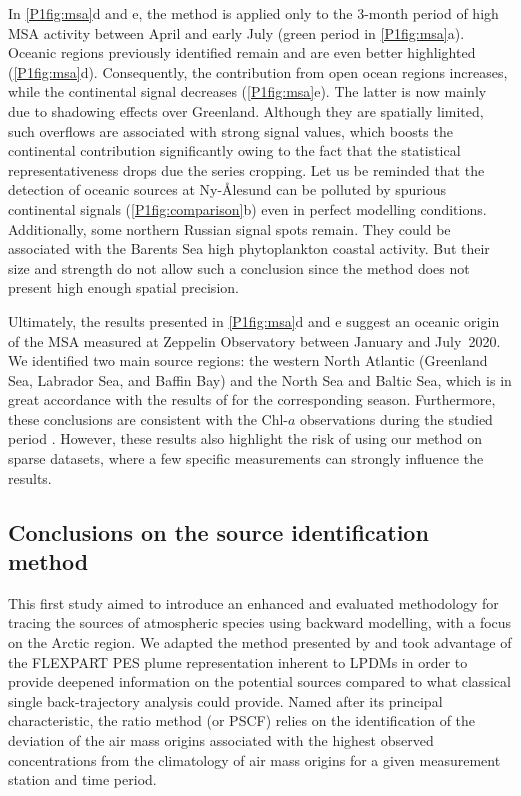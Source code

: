     In \cref{P1fig:msa}d and e, the method is applied only to the 3-month period of high MSA activity between April and early July (green period in \cref{P1fig:msa}a).
    Oceanic regions previously identified remain and are even better highlighted (\cref{P1fig:msa}d).
    Consequently, the contribution from open ocean regions increases, while the continental signal decreases (\cref{P1fig:msa}e).
    The latter is now mainly due to shadowing effects over Greenland.
    Although they are spatially limited, such overflows are associated with strong signal values, which boosts the continental contribution significantly owing to the fact that the statistical representativeness drops due the series cropping.
    Let us be reminded that the detection of oceanic sources at Ny-Ålesund can be polluted by  spurious continental signals (\cref{P1fig:comparison}b) even in perfect modelling conditions.
    Additionally, some northern Russian signal spots remain. They could be associated with the Barents Sea high phytoplankton coastal activity. But their size and strength do not allow such a conclusion since the method does not present high enough spatial precision.

    Ultimately, the results presented in \cref{P1fig:msa}d and e suggest an oceanic origin of the MSA measured at Zeppelin Observatory between January and July~2020.
    We identified two main source regions: the western North Atlantic (Greenland Sea, Labrador Sea, and Baffin Bay) and the North Sea and Baltic Sea, which is in great accordance with the results of \citet{pernov_pan-arctic_2024} for the corresponding season.
    Furthermore, these conclusions are consistent with the Chl-$a$ observations during the studied period \citep{nasa_ocean_biology_processing_group_aqua_2022}.
    However, these results also highlight the risk of using our method on sparse datasets, where a few specific measurements can strongly influence the results.


\subsection{Conclusions on the source identification method}
    This first study aimed to introduce an enhanced and evaluated methodology for tracing the sources of atmospheric species using backward modelling, with a focus on the Arctic region.
    We adapted the method presented by \citet{hirdman_source_2010} and took advantage of the FLEXPART PES plume representation inherent to LPDMs in order to provide deepened information on the potential sources compared to what classical single back-trajectory analysis could provide.
    Named after its principal characteristic, the ratio method (or PSCF) relies on the identification of the deviation of the air mass origins associated with the highest observed concentrations from the climatology of air mass origins for a given measurement station and time period.

